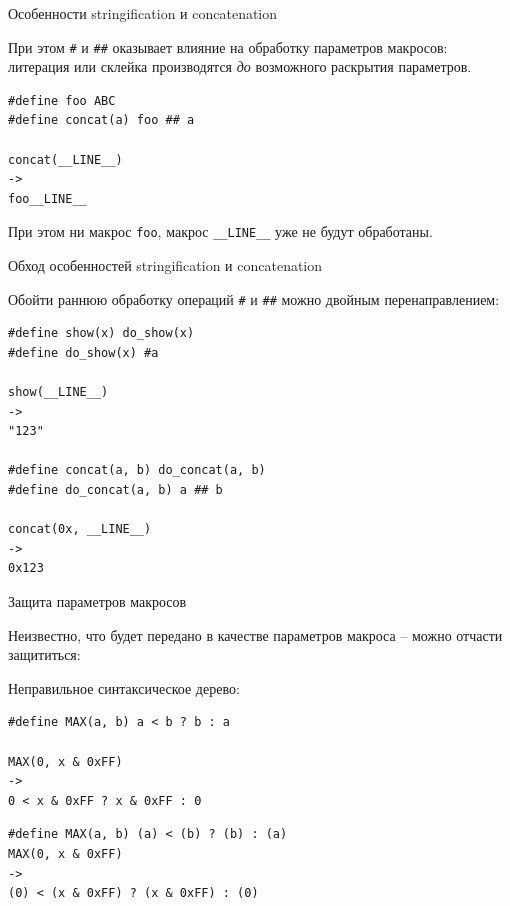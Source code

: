 \documentclass[unknownkeysallowed,xcolor=table]{beamer}
\begin{document}
\begin{frame}[fragile]{Особенности stringification и concatenation}

При этом \lstinline{#} и \lstinline{##} оказывает влияние на обработку параметров макросов: литерация или склейка производятся \emph{до} возможного раскрытия параметров.

\vspace{1em}

\begin{lstlisting}
#define foo ABC
#define concat(a) foo ## a

concat(__LINE__)
->
foo__LINE__
\end{lstlisting}

\vspace{1em}

При этом ни макрос \lstinline{foo}, макрос \lstinline{__LINE__} уже не будут обработаны.

\end{frame}

\begin{frame}[fragile]{Обход особенностей stringification и concatenation}

Обойти раннюю обработку операций \lstinline{#} и \lstinline{##} можно двойным перенаправлением:

\begin{lstlisting}
#define show(x) do_show(x)
#define do_show(x) #a

show(__LINE__)
->
"123"

#define concat(a, b) do_concat(a, b)
#define do_concat(a, b) a ## b

concat(0x, __LINE__)
->
0x123
\end{lstlisting}

\end{frame}

\begin{frame}[fragile]{Защита параметров макросов}

Неизвестно, что будет передано в качестве параметров макроса -- можно отчасти защититься:

\vspace{2em}

Неправильное синтаксическое дерево:
\begin{lstlisting}
#define MAX(a, b) a < b ? b : a

MAX(0, x & 0xFF)
->
0 < x & 0xFF ? x & 0xFF : 0
\end{lstlisting}

\vspace{1em}

\begin{lstlisting}
#define MAX(a, b) (a) < (b) ? (b) : (a)
MAX(0, x & 0xFF)
->
(0) < (x & 0xFF) ? (x & 0xFF) : (0)
\end{lstlisting}

\end{frame}
\end{document}
